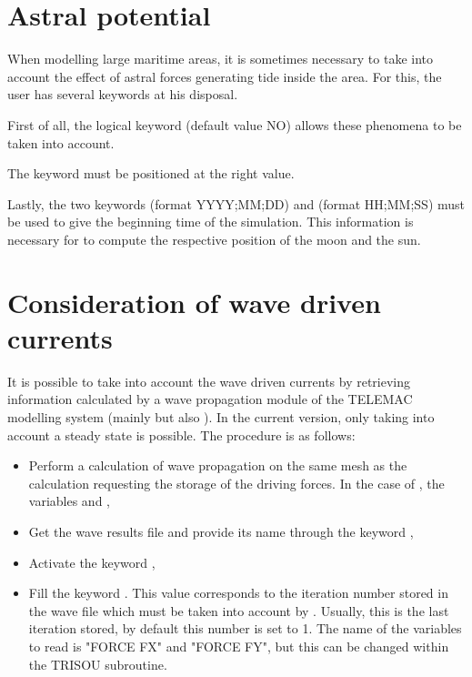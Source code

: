 \section{Astral potential}

When modelling large maritime areas, it is sometimes necessary to take into
account the effect of astral forces generating tide inside the area. For this,
the user has several keywords at his disposal.

First of all, the logical keyword  (default value
NO) allows these phenomena to be taken into account.

The keyword  must be positioned at the right
value.

Lastly, the two keywords  (format YYYY;MM;DD) and
 (format HH;MM;SS) must be used to give the
beginning time of the simulation.  This information is necessary for 
to compute the respective position of the moon and the sun.

\section{Consideration of wave driven currents}

It is possible to take into account the wave driven currents by retrieving
information calculated by a wave propagation module of the TELEMAC modelling
system (mainly \tomawac but also \artemis). In the current version,
only taking into account a steady state is possible. The procedure is as
follows:

\begin{itemize}
\item  Perform a calculation of wave propagation on the same mesh as the
 calculation requesting the storage of the driving forces. In the
case of \tomawac, the variables  and ,

\item  Get the wave results file and provide its name through the keyword
,

\item  Activate the keyword ,

\item  Fill the keyword . This value
corresponds to the iteration number stored in the wave file which must be taken
into account by . Usually, this is the last iteration stored, by
default this number is set to 1. The name of the variables to read is "FORCE
FX" and "FORCE FY", but this can be changed within the TRISOU subroutine.
\end{itemize}

